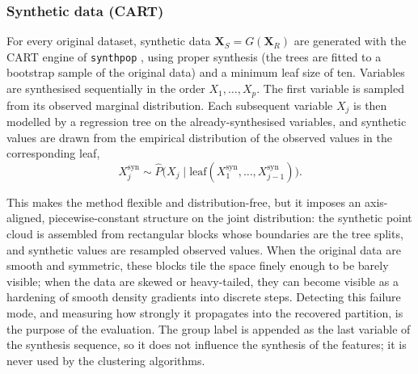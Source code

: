 \documentclass[pdflatex,referee]{sn-jnl}
\newcommand{\bX}{\mathbf{X}}
\begin{document}
\subsubsection{Synthetic data (CART)}
\label{sec:cart}

For every original dataset, synthetic data $\bX_S = G(\bX_R)$ are generated
with the CART engine of \texttt{synthpop} \citep{nowok2016}, using proper
synthesis (the trees are fitted to a bootstrap sample of the original data)
and a minimum leaf size of ten. Variables are synthesised sequentially in the
order $X_1,\dots,X_p$. The first variable is sampled from its observed marginal
distribution. Each subsequent variable $X_j$ is then modelled by a regression
tree \citep[chap.~8]{breiman1984} on the already-synthesised variables, and
synthetic values are drawn from the empirical distribution of the observed
values in the corresponding leaf,
\begin{equation}
  X_j^{\text{syn}} \sim
    \widehat{P}\bigl(X_j \mid
      \text{leaf}(X_1^{\text{syn}},\dots,X_{j-1}^{\text{syn}})\bigr).
  \label{eq:cart}
\end{equation}

This makes the method flexible and distribution-free, but it imposes an
axis-aligned, piecewise-constant structure on the joint distribution: the
synthetic point cloud is assembled from rectangular blocks whose boundaries are
the tree splits, and synthetic values are resampled observed values. When the
original data are smooth and symmetric, these blocks tile the space finely
enough to be barely visible; when the data are skewed or heavy-tailed, they can
become visible as a hardening of smooth density gradients into discrete steps.
Detecting this failure mode, and measuring how strongly it propagates into the
recovered partition, is the purpose of the evaluation. The group label is
appended as the last variable of the synthesis sequence, so it does not
influence the synthesis of the features; it is never used by the clustering
algorithms.
\end{document}
